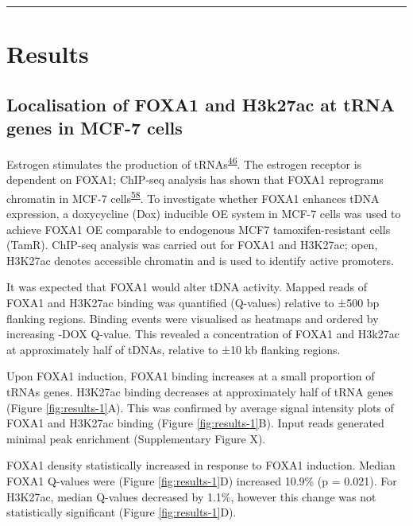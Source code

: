 \documentclass[
  12pt,
]{article}
\begin{document}
\begin{center}\rule{0.5\linewidth}{0.5pt}\end{center}

\hypertarget{results}{%
\section{Results}\label{results}}

\hypertarget{localisation-of-foxa1-and-h3k27ac-at-trna-genes-in-mcf-7-cells}{%
\subsection{Localisation of FOXA1 and H3k27ac at tRNA genes in MCF-7 cells}\label{localisation-of-foxa1-and-h3k27ac-at-trna-genes-in-mcf-7-cells}}

Estrogen stimulates the production of tRNAs\textsuperscript{\protect\hyperlink{ref-Hah2011}{46}}.
The estrogen receptor is dependent on FOXA1; ChIP-seq analysis has shown that FOXA1 reprograms chromatin in MCF-7 cells\textsuperscript{\protect\hyperlink{ref-fu2016}{58}}.
To investigate whether FOXA1 enhances tDNA expression, a doxycycline (Dox) inducible OE system in MCF-7 cells was used to achieve FOXA1 OE comparable to endogenous MCF7 tamoxifen-resistant cells (TamR).
ChIP-seq analysis was carried out for FOXA1 and H3K27ac; open, H3K27ac denotes accessible chromatin and is used to identify active promoters.

It was expected that FOXA1 would alter tDNA activity.
Mapped reads of FOXA1 and H3K27ac binding was quantified (Q-values) relative to ±500 bp flanking regions.
Binding events were visualised as heatmaps and ordered by increasing -DOX Q-value.
This revealed a concentration of FOXA1 and H3k27ac at approximately half of tDNAs, relative to ±10 kb flanking regions.

Upon FOXA1 induction, FOXA1 binding increases at a small proportion of tRNAs genes.
H3K27ac binding decreases at approximately half of tRNA genes (Figure \ref{fig:results-1}A).
This was confirmed by average signal intensity plots of FOXA1 and H3K27ac binding (Figure \ref{fig:results-1}B).
Input reads generated minimal peak enrichment (Supplementary Figure X).

FOXA1 density statistically increased in response to FOXA1 induction.
Median FOXA1 Q-values were (Figure \ref{fig:results-1}D) increased 10.9\% (p = 0.021).
For H3K27ac, median Q-values decreased by 1.1\%, however this change was not statistically significant (Figure \ref{fig:results-1}D).
\end{document}
